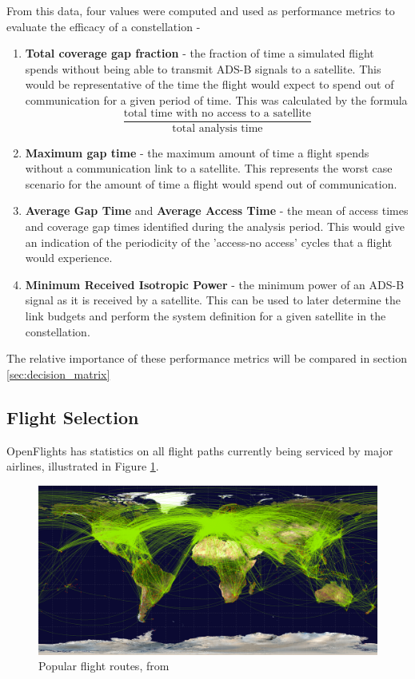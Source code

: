  
From this data, four values were computed and used as performance metrics to evaluate the efficacy of a constellation - 
\begin{enumerate}
	\item \textbf{Total coverage gap fraction} - the fraction of time a simulated flight spends without being able to transmit ADS-B signals to a satellite. This would be representative of the time the flight would expect to spend out of communication for a given period of time. This was calculated by the formula
	\[ \dfrac{\text{total time with no access to a satellite}}{\text{total analysis time}}\]
	\item \textbf{Maximum gap time} - the maximum amount of time a flight spends without a communication link to a satellite. This represents the worst case scenario for the amount of time a flight would spend out of communication.
	\item \textbf{Average Gap Time} and \textbf{Average Access Time} - the mean of access times and coverage gap times identified during the analysis period. This would give an indication of the periodicity of the 'access-no access' cycles that a flight would experience.
	\item \textbf{Minimum Received Isotropic Power} - the minimum power of an ADS-B signal as it is received by a satellite. This can be used to later determine the link budgets and perform the system definition for a given satellite in the constellation.
	
\end{enumerate}
The relative importance of these performance metrics will be compared in section \ref{sec:decision_matrix}

\subsection{Flight Selection} \label{sec:flight_selection}
OpenFlights \cite{Open} has statistics on all flight paths currently being serviced by major airlines, illustrated in Figure \ref{fig:flightpaths}.
\begin{figure}[htbpp]
	\centering
	\includegraphics[scale = 0.18]{Pictures/flightpaths.png}
	
	\caption[Popular flight routes]{Popular flight routes, from \cite{Open}}
	\label{fig:flightpaths}
\end{figure} 

